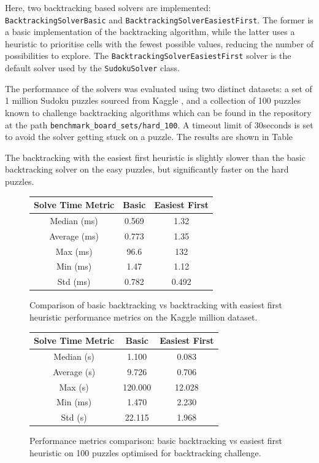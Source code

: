 \documentclass[11pt]{article}
\begin{document}
\begin{itemize}
Here, two backtracking based solvers are implemented: \texttt{BacktrackingSolverBasic} and \texttt{BacktrackingSolverEasiestFirst}. The former is a basic implementation of the backtracking algorithm, while the latter uses a heuristic to prioritise cells with the fewest possible values, reducing the number of possibilities to explore. The \texttt{BacktrackingSolverEasiestFirst} solver is the default solver used by the \texttt{SudokuSolver} class.

The performance of the solvers was evaluated using two distinct datasets: a set of 1 million Sudoku puzzles sourced from Kaggle \cite{kaggleDataset}, and a collection of 100 puzzles known to challenge backtracking algorithms which can be found in the repository at the path \texttt{benchmark\_board\_sets/hard\_100}. A timeout limit of 30seconds is set to avoid the solver getting stuck on a puzzle. The results are shown in Table 

The backtracking with the easiest first heuristic is slightly slower than the basic backtracking solver on the easy puzzles, but significantly faster on the hard puzzles. 
\begin{figure}[h!]
    \centering
    \begin{tabular}{|c|c|c|}
    \hline
    Solve Time Metric & Basic & Easiest First \\
    \hline
    Median (ms) & 0.569 & 1.32 \\
    \hline
    Average (ms) & 0.773 & 1.35 \\
    \hline
    Max (ms) & 96.6 & 132 \\
    \hline
    Min (ms) & 1.47 & 1.12 \\
    \hline
    Std (ms) & 0.782 & 0.492 \\
    \hline
    \end{tabular}
    \caption{Comparison of basic backtracking vs backtracking with easiest first heuristic performance metrics on the Kaggle million dataset.}
\end{figure}

\begin{figure}[h!]
    \centering
    \begin{tabular}{|c|c|c|}
    \hline
    Solve Time Metric & Basic & Easiest First \\
    \hline
    Median (s) & 1.100 & 0.083 \\
    \hline
    Average (s) & 9.726 & 0.706 \\
    \hline
    Max (s) & 120.000 & 12.028 \\
    \hline
    Min (ms) & 1.470 & 2.230 \\
    \hline
    Std (s) & 22.115 & 1.968 \\
    \hline
    \end{tabular}
    \caption{Performance metrics comparison: basic backtracking vs easiest first heuristic on 100 puzzles optimised for backtracking challenge.}



\end{figure}
\end{itemize}
\end{document}
